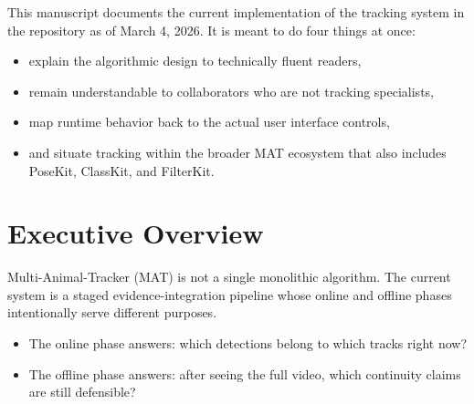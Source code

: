 \documentclass[11pt]{article}
\newcommand{\codepath}[1]{\path{#1}}
\begin{document}
\begin{titlepage}
\vspace{1.1cm}

\begin{minipage}{0.92\linewidth}
\color{Ink}
\large
This manuscript documents the current implementation of the tracking system in the repository as of March 4, 2026. It is meant to do four things at once:

\begin{itemize}
  \item explain the algorithmic design to technically fluent readers,
  \item remain understandable to collaborators who are not tracking specialists,
  \item map runtime behavior back to the actual user interface controls,
  \item and situate tracking within the broader MAT ecosystem that also includes PoseKit, ClassKit, and FilterKit.
\end{itemize}
\end{minipage}

\vfill


\end{titlepage}

\clearpage
{}
\tableofcontents
\clearpage

\section{Executive Overview}

Multi-Animal-Tracker (MAT) is not a single monolithic algorithm. The current system is a staged evidence-integration pipeline whose online and offline phases intentionally serve different purposes.

\begin{itemize}
  \item The online phase answers: which detections belong to which tracks right now?
  \item The offline phase answers: after seeing the full video, which continuity claims are still defensible?
\end{itemize}
\end{document}
